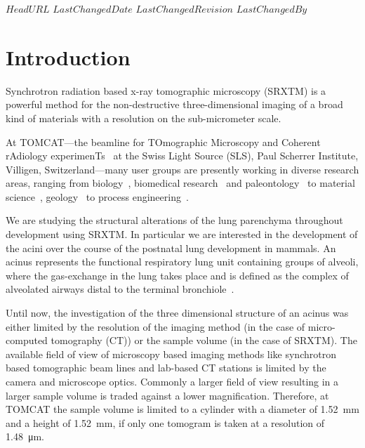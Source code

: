 \svnidlong
{$HeadURL$}
{$LastChangedDate$}
{$LastChangedRevision$}
{$LastChangedBy$}

\ifhtml
\else
\begin{center}
\end{center}
\fi

\section{Introduction}

Synchrotron radiation based x-ray tomographic microscopy (SRXTM) is a powerful method for the non-destructive three-dimensional imaging of a broad kind of materials with a resolution on the sub-micrometer scale.

At TOMCAT---the beamline for TOmographic Microscopy and Coherent rAdiology experimenTs~\cite{Stampanoni2007} at the Swiss Light Source (SLS), Paul Scherrer Institute, Villigen, Switzerland---many user groups are presently working in diverse research areas, ranging from biology~\cite{McDonald2009,PerezHuerta2009}, biomedical research~\cite{Schittny2008,Tsuda2008,Heinzer2008} and paleontology~\cite{Gostling2008,Friis2007,Hagadorn2006,Donoghue2006} to material science~\cite{Gallucci2007}, geology~\cite{Carminati2007} to process engineering~\cite{Davenport2007,Vaucher2007}.

We are studying the structural alterations of the lung parenchyma throughout development using SRXTM. In particular we are interested in the development of the acini over the course of the postnatal lung development in mammals. An acinus represents the functional respiratory lung unit containing groups of alveoli, where the gas-exchange in the lung takes place and is defined as the complex of alveolated airways distal to the terminal bronchiole~\cite{Rodriguez1987}.

Until now, the investigation of the three dimensional structure of an acinus was either limited by the resolution of the imaging method (in the case of micro-computed tomography (\micro CT)) or the sample volume (in the case of SRXTM).  The available field of view of microscopy based imaging methods like synchrotron based tomographic beam lines and lab-based \micro CT stations is limited by the camera and microscope optics. Commonly a larger field of view resulting in a larger sample volume is traded against a lower magnification. Therefore, at TOMCAT the sample volume is limited to a cylinder with a diameter of \SI{1.52}{\milli\meter} and a height of \SI{1.52}{\milli\meter}, if only one tomogram is taken at a resolution of \SI{1.48}{\micro\meter}.

